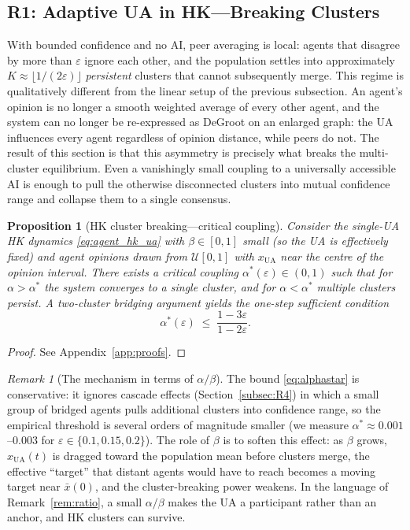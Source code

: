 \documentclass{article}
\theoremstyle{plain}
\newtheorem{proposition}[theorem]{Proposition}
\theoremstyle{definition}
\theoremstyle{remark}
\newtheorem{remark}[theorem]{Remark}
\newcommand{\xUA}{x_{\mathrm{UA}}}
\newcommand{\xbar}{\bar{x}}
\begin{document}
\subsection{R1: Adaptive UA in HK---Breaking Clusters}
\label{subsec:R1}

With bounded confidence and no AI, peer averaging is local: agents
that disagree by more than $\varepsilon$ ignore each other, and the
population settles into approximately
$K\approx\lfloor 1/(2\varepsilon)\rfloor$ \emph{persistent} clusters
that cannot subsequently merge.  This regime is qualitatively
different from the linear setup of the previous subsection.  An
agent's opinion is no longer a smooth weighted average of every other
agent, and the system can no longer be re-expressed as DeGroot on an
enlarged graph: the UA influences every agent regardless of opinion
distance, while peers do not.  The result of this section is that
this asymmetry is precisely what breaks the multi-cluster equilibrium.
Even a vanishingly small coupling to a universally accessible AI is
enough to pull the otherwise disconnected clusters into mutual
confidence range and collapse them to a single consensus.

\begin{proposition}[HK cluster breaking---critical coupling]
\label{prop:R2}
Consider the single-UA HK dynamics \eqref{eq:agent_hk_ua} with
$\beta\in[0,1]$ small (so the UA is effectively fixed) and
agent opinions drawn from $\mathcal{U}[0,1]$ with $\xUA$ near the
centre of the opinion interval.  There exists a critical coupling
$\alpha^*(\varepsilon)\in(0,1)$ such that for $\alpha>\alpha^*$ the
system converges to a single cluster, and for $\alpha<\alpha^*$
multiple clusters persist.  A two-cluster bridging argument yields
the one-step sufficient condition
\begin{equation}
    \alpha^*(\varepsilon)
    \;\le\; \frac{1-3\varepsilon}{1-2\varepsilon}.
    \label{eq:alphastar}
\end{equation}
\end{proposition}

\begin{proof}
See Appendix~\ref{app:proofs}.
\end{proof}

\begin{remark}[The mechanism in terms of $\alpha/\beta$]
\label{rem:R2_ratio}
The bound \eqref{eq:alphastar} is conservative: it ignores cascade
effects (Section~\ref{subsec:R4}) in which a small group of bridged
agents pulls additional clusters into confidence range, so the
empirical threshold is several orders of magnitude smaller (we
measure $\alpha^*\approx 0.001$--$0.003$ for
$\varepsilon\in\{0.1,0.15,0.2\}$).  The role of $\beta$ is to soften
this effect: as $\beta$ grows, $\xUA(t)$ is dragged toward the
population mean before clusters merge, the effective ``target''
that distant agents would have to reach becomes a moving target near
$\xbar(0)$, and the cluster-breaking power weakens.  In the language
of Remark~\ref{rem:ratio}, a small $\alpha/\beta$ makes the UA a
participant rather than an anchor, and HK clusters can survive.
\end{remark}
\end{document}
